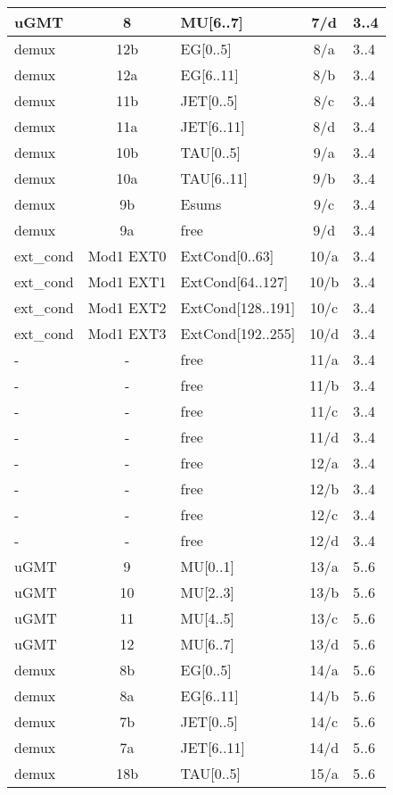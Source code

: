 \begin{longtable}{|l|c|l|c|l|}
uGMT  & 8   & MU[6..7]   & 7/d  & 3..4 \\\hline
demux & 12b & EG[0..5]   & 8/a  & 3..4 \\\hline
demux & 12a & EG[6..11]  & 8/b  & 3..4 \\\hline
demux & 11b & JET[0..5]  & 8/c  & 3..4 \\\hline
demux & 11a & JET[6..11] & 8/d  & 3..4 \\\hline
demux & 10b & TAU[0..5]  & 9/a  & 3..4 \\\hline
demux & 10a & TAU[6..11] & 9/b  & 3..4 \\\hline
demux & 9b  & Esums      & 9/c  & 3..4 \\\hline
demux & 9a  & free       & 9/d  & 3..4 \\\hline
ext\_cond & Mod1 EXT0 & ExtCond[0..63]    & 10/a & 3..4 \\\hline
ext\_cond & Mod1 EXT1 & ExtCond[64..127]  & 10/b & 3..4 \\\hline
ext\_cond & Mod1 EXT2 & ExtCond[128..191] & 10/c & 3..4 \\\hline
ext\_cond & Mod1 EXT3 & ExtCond[192..255] & 10/d & 3..4 \\\hline
- & - & free & 11/a & 3..4 \\\hline
- & - & free & 11/b & 3..4 \\\hline
- & - & free & 11/c & 3..4 \\\hline
- & - & free & 11/d & 3..4 \\\hline
- & - & free & 12/a & 3..4 \\\hline
- & - & free & 12/b & 3..4 \\\hline
- & - & free & 12/c & 3..4 \\\hline
- & - & free & 12/d & 3..4 \\\hline
\hline
uGMT  & 9   & MU[0..1]   & 13/a & 5..6 \\\hline
uGMT  & 10  & MU[2..3]   & 13/b & 5..6 \\\hline
uGMT  & 11  & MU[4..5]   & 13/c & 5..6 \\\hline
uGMT  & 12  & MU[6..7]   & 13/d & 5..6 \\\hline
demux & 8b  & EG[0..5]   & 14/a & 5..6 \\\hline
demux & 8a  & EG[6..11]  & 14/b & 5..6 \\\hline
demux & 7b  & JET[0..5]  & 14/c & 5..6 \\\hline
demux & 7a  & JET[6..11] & 14/d & 5..6 \\\hline
demux & 18b & TAU[0..5]  & 15/a & 5..6 \\\hline

\end{longtable}
